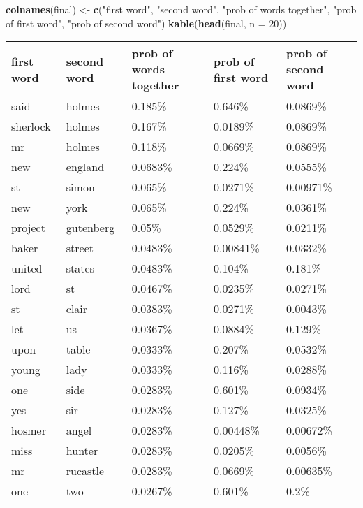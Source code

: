 \documentclass[]{article}
\newenvironment{Shaded}{\begin{snugshade}}{\end{snugshade}}
\newcommand{\KeywordTok}[1]{\textcolor[rgb]{0.13,0.29,0.53}{\textbf{{#1}}}}
\newcommand{\DataTypeTok}[1]{\textcolor[rgb]{0.13,0.29,0.53}{{#1}}}
\newcommand{\DecValTok}[1]{\textcolor[rgb]{0.00,0.00,0.81}{{#1}}}
\newcommand{\StringTok}[1]{\textcolor[rgb]{0.31,0.60,0.02}{{#1}}}
\newcommand{\NormalTok}[1]{{#1}}
\begin{document}
\begin{Shaded}
\begin{Highlighting}[]
\KeywordTok{colnames}\NormalTok{(final) <-}\StringTok{ }\KeywordTok{c}\NormalTok{(}\StringTok{"first word"}\NormalTok{, }\StringTok{"second word"}\NormalTok{, }
                          \StringTok{"prob of words together"}\NormalTok{, }\StringTok{"prob of first word"}\NormalTok{, }
                          \StringTok{"prob of second word"}\NormalTok{)}
\KeywordTok{kable}\NormalTok{(}\KeywordTok{head}\NormalTok{(final, }\DataTypeTok{n =} \DecValTok{20}\NormalTok{))}
\end{Highlighting}
\end{Shaded}

\begin{longtable}[]{@{}lllll@{}}
\toprule
first word & second word & prob of words together & prob of first word &
prob of second word\tabularnewline
\midrule
\endhead
said & holmes & 0.185\% & 0.646\% & 0.0869\%\tabularnewline
sherlock & holmes & 0.167\% & 0.0189\% & 0.0869\%\tabularnewline
mr & holmes & 0.118\% & 0.0669\% & 0.0869\%\tabularnewline
new & england & 0.0683\% & 0.224\% & 0.0555\%\tabularnewline
st & simon & 0.065\% & 0.0271\% & 0.00971\%\tabularnewline
new & york & 0.065\% & 0.224\% & 0.0361\%\tabularnewline
project & gutenberg & 0.05\% & 0.0529\% & 0.0211\%\tabularnewline
baker & street & 0.0483\% & 0.00841\% & 0.0332\%\tabularnewline
united & states & 0.0483\% & 0.104\% & 0.181\%\tabularnewline
lord & st & 0.0467\% & 0.0235\% & 0.0271\%\tabularnewline
st & clair & 0.0383\% & 0.0271\% & 0.0043\%\tabularnewline
let & us & 0.0367\% & 0.0884\% & 0.129\%\tabularnewline
upon & table & 0.0333\% & 0.207\% & 0.0532\%\tabularnewline
young & lady & 0.0333\% & 0.116\% & 0.0288\%\tabularnewline
one & side & 0.0283\% & 0.601\% & 0.0934\%\tabularnewline
yes & sir & 0.0283\% & 0.127\% & 0.0325\%\tabularnewline
hosmer & angel & 0.0283\% & 0.00448\% & 0.00672\%\tabularnewline
miss & hunter & 0.0283\% & 0.0205\% & 0.0056\%\tabularnewline
mr & rucastle & 0.0283\% & 0.0669\% & 0.00635\%\tabularnewline
one & two & 0.0267\% & 0.601\% & 0.2\%\tabularnewline
\bottomrule
\end{longtable}
\end{document}

